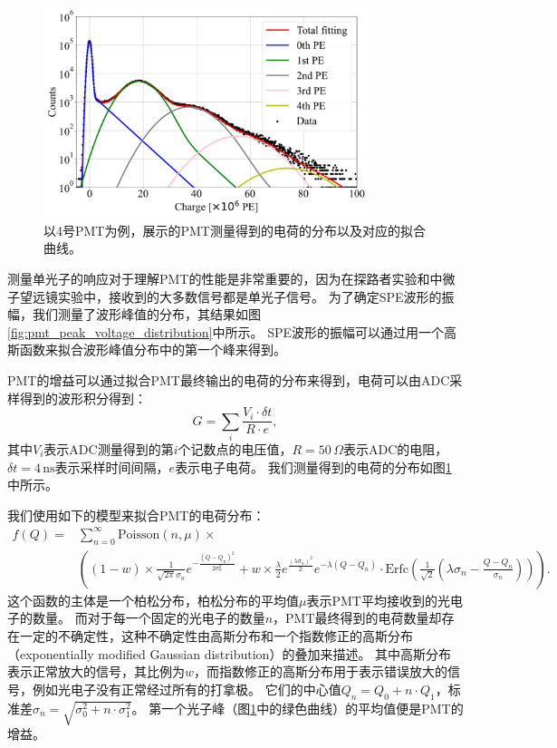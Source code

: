 \begin{figure}[!hb]
    \centering
    \includegraphics[width=0.85\textwidth]{img/pmt_charge_distribution.pdf}
    \caption{
    以4号PMT为例，展示的PMT测量得到的电荷的分布以及对应的拟合曲线。}
    \label{fig:pmt_charge_distribution}
\end{figure} 

测量单光子的响应对于理解PMT的性能是非常重要的，因为在探路者实验和中微子望远镜实验中，接收到的大多数信号都是单光子信号。
为了确定SPE波形的振幅，我们测量了波形峰值的分布，其结果如图\ref{fig:pmt_peak_voltage_distribution}中所示。
SPE波形的振幅可以通过用一个高斯函数来拟合波形峰值分布中的第一个峰来得到。

PMT的增益可以通过拟合PMT最终输出的电荷的分布来得到，电荷可以由ADC采样得到的波形积分得到：
\begin{equation}
    G = \sum_{i}\frac{V_i \cdot \delta t}{R \cdot e} ,
\end{equation}
其中$V_i$表示ADC测量得到的第$i$个记数点的电压值，$R = 50 \,\Omega$表示ADC的电阻，$\delta t = 4 \,\mathrm{ns}$表示采样时间间隔，$e$表示电子电荷。
我们测量得到的电荷的分布如图\ref{fig:pmt_charge_distribution}中所示。

我们使用如下的模型来拟合PMT的电荷分布\cite{PMT_fit_function:1994}：
\begin{equation}
    \begin{aligned}
        f(Q) = & \sum_{n=0}^{\infty} \text{Poisson}( n , \mu ) \times \\
        & \left( (1-w) \times \frac{1}{\sqrt{2\pi} \sigma_n} e^{-\frac{(Q-Q_n)^2}{2\sigma_n^2}} + w \times  \frac{\lambda}{2} e^{ \frac{ ( \lambda \sigma_n )^2 }{2} } e^{ - \lambda ( Q - Q_n ) } \cdot \text{Erfc} \left( \frac{1}{\sqrt{2}} \left( \lambda \sigma_n - \frac{ Q - Q_n }{ \sigma_n } \right) \right) \right) .
    \end{aligned}
    \label{eq:pmt_charge}
\end{equation}
这个函数的主体是一个柏松分布，柏松分布的平均值$\mu$表示PMT平均接收到的光电子的数量。
而对于每一个固定的光电子的数量$n$，PMT最终得到的电荷数量却存在一定的不确定性，这种不确定性由高斯分布和一个指数修正的高斯分布（exponentially modified Gaussian distribution）的叠加来描述。
其中高斯分布表示正常放大的信号，其比例为$w$，而指数修正的高斯分布用于表示错误放大的信号，例如光电子没有正常经过所有的打拿极。
它们的中心值$Q_{n} = Q_{0} + n \cdot Q_{1}$，标准差$\sigma_{n} = \sqrt{\sigma_{0}^{2} + n \cdot \sigma_{1}^{2}}$。
第一个光子峰（图\ref{fig:pmt_charge_distribution}中的绿色曲线）的平均值便是PMT的增益。

